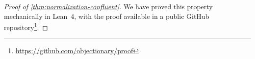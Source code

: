 
\begin{proof}[Proof of \cref{thm:normalization-confluent}]
We have proved this property mechanically in Lean~4,
  with the proof available in a public
  GitHub repository\footnote{\url{https://github.com/objectionary/proof}}.
\end{proof}
